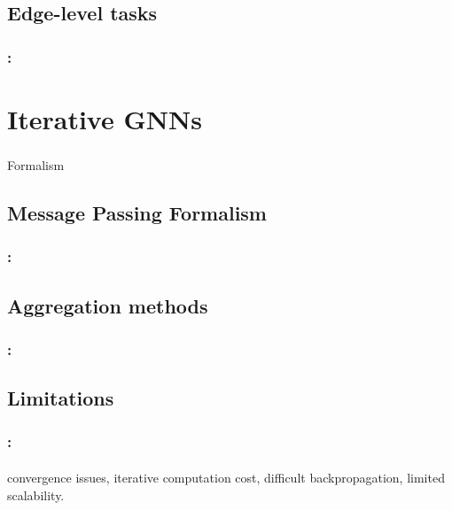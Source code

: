 \documentclass[xcolor=table]{beamer}
\begin{document}
\subsection{Edge-level tasks}

\begin{frame}
	\frametitle{\insertshortsubtitle: \insertsection}
	\framesubtitle{\insertsubsection}
	
	
\end{frame}

\section{Iterative GNNs}

\begin{frame}
	\frametitle{\insertshortsubtitle}
	\framesubtitle{\insertsection}
	
	Formalism
	
\end{frame}

\subsection{Message Passing Formalism}

\begin{frame}
	\frametitle{\insertshortsubtitle: \insertsection}
	\framesubtitle{\insertsubsection}
	
	
\end{frame}

\subsection{Aggregation methods}

\begin{frame}
	\frametitle{\insertshortsubtitle: \insertsection}
	\framesubtitle{\insertsubsection}
	
	
\end{frame}

\subsection{Limitations}

\begin{frame}
	\frametitle{\insertshortsubtitle: \insertsection}
	\framesubtitle{\insertsubsection}
	
	convergence issues,
	iterative computation cost,
	difficult backpropagation,
	limited scalability.
	
\end{frame}
\end{document}
